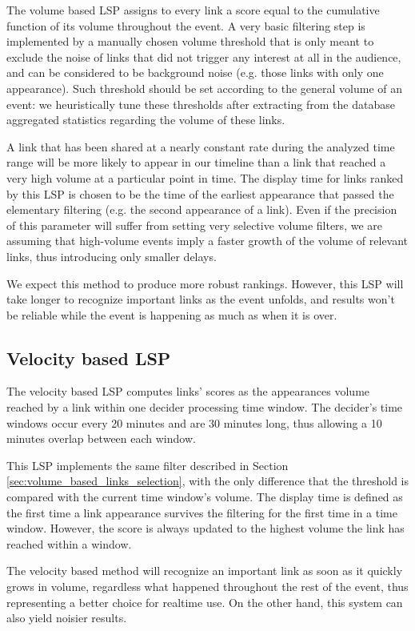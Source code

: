 \documentclass{sig-alternate}
\begin{document}
The volume based LSP assigns to every link a score equal to the cumulative function of its volume throughout the event. A very basic filtering step is implemented by a manually chosen volume threshold that is only meant to exclude the noise of links that did not trigger any interest at all in the audience, and can be considered to be background noise (e.g. those links with only one appearance). Such threshold should be set according to the general volume of an event: we heuristically tune these thresholds after extracting from the database aggregated statistics regarding the volume of these links.

A link that has been shared at a nearly constant rate during the analyzed time range will be more likely to appear in our timeline than a link that reached a very high volume at a particular point in time. The display time for links ranked by this LSP is chosen to be the time of the earliest appearance that passed the elementary filtering (e.g. the second appearance of a link). Even if the precision of this parameter will suffer from setting very selective volume filters, we are assuming that high-volume events imply a faster growth of the volume of relevant links, thus introducing only smaller delays.

We expect this method to produce more robust rankings. However, this LSP will take longer to recognize important links as the event unfolds, and results won't be reliable while the event is happening as much as when it is over.

\subsection{Velocity based LSP}
\label{sec:velocity_based_links_selection}
The velocity based LSP computes links' scores as the appearances volume reached by a link within one decider processing time window. The decider's time windows occur every 20 minutes and are 30 minutes long, thus allowing a 10 minutes overlap between each window.

This LSP implements the same filter described in Section \ref{sec:volume_based_links_selection}, with the only difference that the threshold is compared with the current time window's volume. The display time is defined as the first time a link appearance survives the filtering for the first time in a time window. However, the score is always updated to the highest volume the link has reached within a window.

The velocity based method will recognize an important link as soon as it quickly grows in volume, regardless what happened throughout the rest of the event, thus representing a better choice for realtime use. On the other hand, this system can also yield noisier results.
\end{document}
